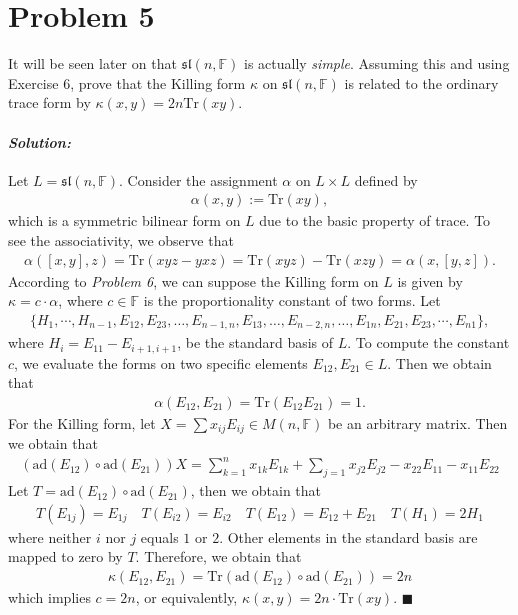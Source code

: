 \documentclass[12pt, a4paper]{article}
\newenvironment{solution}
  {\paragraph{\textit{Solution:}}\par\medskip}
  {\hfill$\blacksquare$\vspace{0.1cm}}
\begin{document}
\section*{Problem 5}
It will be seen later on that $\mathfrak{sl}(n, \mathbb{F})$ is actually \textit{simple}. Assuming this and using Exercise 6, prove that the Killing form $\kappa$ on $\mathfrak{sl}(n, \mathbb{F})$ is related to the ordinary trace form by $\kappa(x, y) = 2n \text{Tr}(xy)$.
\begin{solution}
  Let $L=\mathfrak{sl}(n, \mathbb{F})$. Consider the assignment $\alpha$ on $L\times L$ defined by 
  \begin{align*}
    \alpha(x,y) := \text{Tr}(xy),
  \end{align*}
  which is a symmetric bilinear form on $L$ due to the basic property of trace. To see the associativity, we observe that 
  \begin{align*}
    \alpha([x,y],z) = \text{Tr}(xyz-yxz) = \text{Tr}(xyz) - \text{Tr}(xzy)=\alpha(x,[y,z]).
  \end{align*}
  According to \textit{Problem 6}, we can suppose the Killing form on $L$ is given by $\kappa = c\cdot \alpha$, where $c\in \mathbb{F}$ is the proportionality constant of two forms.
  Let 
  \begin{align*}
    \{H_1,\cdots,H_{n-1},E_{12},E_{23},\dots,E_{n-1,n},E_{13},\dots,E_{n-2,n},\dots,E_{1n},E_{21},E_{23},\cdots,E_{n1}\},
  \end{align*}
  where $H_i = E_{11}-E_{i+1,i+1}$, be the standard basis of $L$.
  To compute the constant $c$, we evaluate the forms on two specific elements $E_{12},E_{21}\in L$. Then we obtain that 
  \begin{align*}
    \alpha(E_{12},E_{21}) = \text{Tr}(E_{12}E_{21}) = 1.
  \end{align*} 
  For the Killing form, let $X=\sum x_{ij}E_{ij}\in M(n,\mathbb{F})$ be an arbitrary matrix. Then we obtain that 
  \begin{align*}
    \left(\text{ad}(E_{12})\circ \text{ad}(E_{21})\right) X = \sum_{k=1}^n x_{1k}E_{1k} +\sum_{j=1}x_{j2}E_{j2} - x_{22}E_{11}-x_{11}E_{22}
   \end{align*}
   Let $T=\text{ad}(E_{12})\circ \text{ad}(E_{21})$, then we obtain that 
   \begin{align*}
    T (E_{1j}) = E_{1j}  \quad 
     T(E_{i2}) = E_{i2}  \quad 
    T (E_{12}) =E_{12} + E_{21} \quad 
    T(H_1) = 2 H_1 
   \end{align*}
   where neither $i$ nor $j$ equals $1$ or $2$. Other elements in the standard basis are mapped to zero by $T$. Therefore, we obtain that 
   \begin{align*}
    \kappa(E_{12},E_{21}) = \text{Tr}(\text{ad}(E_{12})\circ \text{ad}(E_{21})) = 2n
   \end{align*}
   which implies $c = 2n$, or equivalently, $\kappa(x,y) =2n\cdot \text{Tr}(xy) $.
\end{solution}
\end{document}
